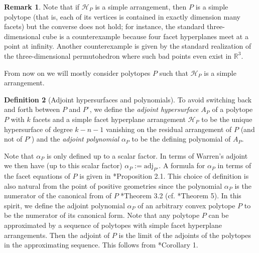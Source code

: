 \documentclass[a4paper,10pt]{amsart}
\theoremstyle{definition}
\newtheorem{Def}{Definition}[section]
\newtheorem{rem}[Def]{Remark}
\theoremstyle{plain}
\newcommand{\R}{{\mathbb R}}
\begin{document}
\begin{rem}
    Note that if $\mathcal{H}_P$ is a simple arrangement, then $P$ is a simple polytope (that is, each of its vertices is contained in exactly dimension many facets) but the converse does not hold; for instance, the standard three-dimensional cube is a counterexample because four facet hyperplanes meet at a point at infinity. Another counterexample is given by the standard realization of the three-dimensional permutohedron where such bad points even exist in $\R^3$.
\end{rem}

From now on we will mostly consider polytopes $P$ such that $\mathcal{H}_P$ is a simple arrangement.

\begin{Def}[Adjoint hypersurfaces and polynomials]
    To avoid switching back and forth between $P$ and $P^\circ$, we define the \emph{adjoint hypersurface} $A_P$ of a polytope $P$ with $k$ facets and a simple facet hyperplane arrangement $\mathcal{H}_P$ to be the unique hypersurface of degree $k-n-1$ vanishing on the residual arrangement of $P$ (and not of $P^\circ$) and the \emph{adjoint polynomial} $\alpha_P$ to be the defining polynomial of $A_P$.
\end{Def}

Note that $\alpha_P$ is only defined up to a scalar factor. In terms of Warren's adjoint we then have (up to this scalar factor) $\alpha_P := \mathrm{adj}_{P^\circ}$. A formula for $\alpha_P$ in terms of the facet equations of $P$ is given in \cite{PavlovTelen2024PosGeom}*{Proposition 2.1}. This choice of definition is also natural from the point of positive geometries since the polynomial $\alpha_P$ is the numerator of the canonical from of $P$ \cite{gaetz2020positive}*{Theorem 3.2} (cf. \cite{Lam2022PosGeom}*{Theorem 5}). In this spirit, we define the adjoint polynomial $\alpha_P$ of an arbitrary convex polytope $P$ to be the numerator of its canonical form. Note that any polytope $P$ can be approximated by a sequence of polytopes with simple facet hyperplane arrangements. Then the adjoint of $P$ is the limit of the adjoints of the polytopes in the approximating sequence. This follows from \cite{KohnRanestad2019AdjCurves}*{Corollary 1}. 
\end{document}
